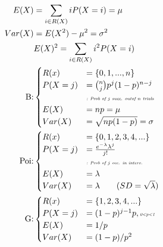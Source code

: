 \documentclass{article}
\newcommand{\note}[1]{\tiny\smash{\textit{#1}}}
\begin{document}
\begin{minipage}{0.45\textwidth}
	\begin{align*}
		E(X) &= \sum_{i \in R(X)} i P(X=i) = \mu \\
		Var(X) &= E(X^2)-\mu^2=\sigma^2 \\
		&{\small{E(X)^2 = \sum_{i \in R(X)} i^2 P(X=i)}} \\
		\text{B:} &
		\begin{cases}
			R(x) &= \{ 0, 1, ..., n \} \\
			P(X=j) &= \binom{n}{j} p^j (1 - p)^{n-j} \\
			&\note{: Prob of $j$ succ. outof $n$ trials} \\
			E(X) &= np = \mu \\
			Var(X) &= \sqrt{np(1-p)} = \sigma
		\end{cases} \\
		\text{Poi:} &
		\begin{cases}
			R(x) &= \{ 0, 1, 2, 3,4 , ... \} \\
			P(X=j) &= \frac{e^{-\lambda}\lambda^j}{j!} \\
			&\note{: Prob of $j$ occ. in interv.} \\
			E(X) &= \lambda \\
			Var(X) &= \lambda \qquad (SD = \sqrt{\lambda})
		\end{cases} \\
		\text{G:} &
		\begin{cases}
			R(x) &= \{ 1, 2, 3, 4 , ... \} \\
			P(X=j) &= (1-p)^{j-1} p, \note{0<p<1} \\
			E(X) &= 1/p \\
			Var(X) &= (1-p)/p^2
		\end{cases}
	\end{align*}
\end{minipage}
\newpage
\end{document}
